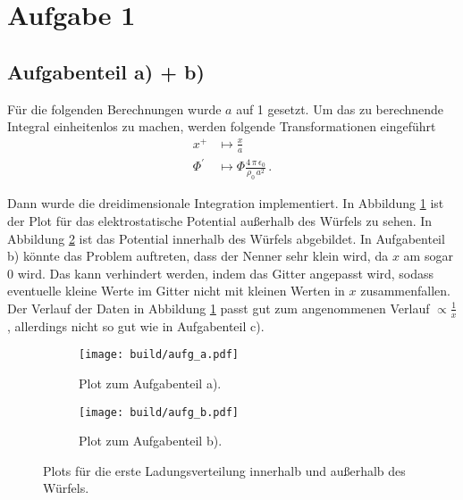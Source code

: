 \section*{Aufgabe 1}
\subsection*{Aufgabenteil a) + b)}
Für die folgenden Berechnungen wurde $a$ auf 1 gesetzt.
Um das zu berechnende Integral einheitenlos zu machen, werden folgende Transformationen
eingeführt
\begin{align*}
  x^+ &\mapsto \frac{x}{a} \\
  \Phi^{'} &\mapsto \Phi  \frac{4\, \pi \, \epsilon_0}{\rho_0 \, a^2} \, .
\end{align*}

Dann wurde die dreidimensionale Integration implementiert. In Abbildung
\ref{subfig:a} ist der Plot für das elektrostatische Potential außerhalb des
Würfels zu sehen. In Abbildung \ref{subfig:b} ist das Potential innerhalb des
Würfels abgebildet. In Aufgabenteil b) könnte das Problem auftreten, dass der
Nenner sehr klein wird, da $x$ am sogar 0 wird. Das kann verhindert werden,
indem das Gitter angepasst wird, sodass eventuelle kleine Werte im Gitter nicht
mit kleinen Werten in $x$ zusammenfallen. Der Verlauf der Daten in Abbildung
\ref{subfig:a} passt gut zum angenommenen Verlauf $ \propto \frac{1}{x}$, allerdings
nicht so gut wie in Aufgabenteil c).

\begin{figure}
  \centering
  \begin{subfigure}{0.49\textwidth}
    \centering
    \texttt{[image: build/aufg\_a.pdf]}
    \caption{Plot zum Aufgabenteil a).}
    \label{subfig:a}
  \end{subfigure}
  \begin{subfigure}{0.49\textwidth}
    \centering
    \texttt{[image: build/aufg\_b.pdf]}
    \caption{Plot zum Aufgabenteil b).}
    \label{subfig:b}
  \end{subfigure}
  \caption{Plots für die erste Ladungsverteilung innerhalb und außerhalb
  des Würfels.}
  \label{fig:1}
\end{figure}

